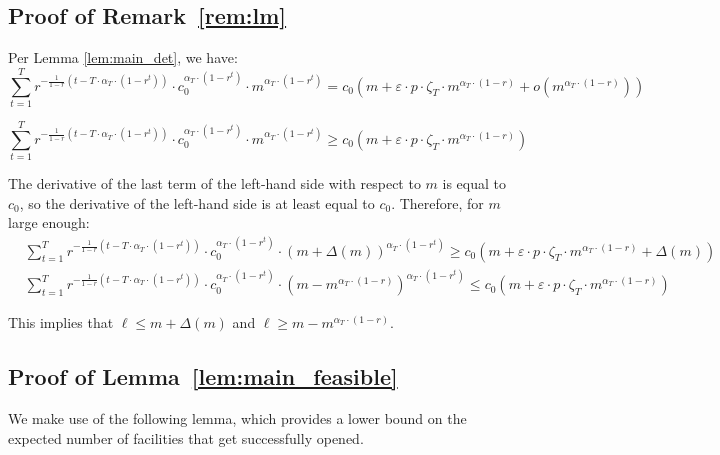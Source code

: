 \documentclass[nonblindrev]{informs3noheader}
\begin{document}

\subsection{Proof of Remark~\ref{rem:lm}}

Per Lemma \ref{lem:main_det}, we have:
\[\sum_{t=1}^T r^{-\frac{1}{1-r}\left(t-T\cdot\alpha_T\cdot(1-r^t)\right)}\cdot c_0^{\alpha_T\cdot(1-r^t)}\cdot m^{\alpha_T\cdot(1-r^t)}= c_0\left(m+\varepsilon\cdot p\cdot\zeta_T\cdot m^{\alpha_T\cdot(1-r)} + o\left(m^{\alpha_T \cdot (1-r)}\right)\right) \]

\[\sum_{t=1}^T r^{-\frac{1}{1-r}\left(t-T\cdot\alpha_T\cdot(1-r^t)\right)}\cdot c_0^{\alpha_T\cdot(1-r^t)}\cdot m^{\alpha_T\cdot(1-r^t)}\geq c_0\left(m+\varepsilon\cdot p\cdot\zeta_T\cdot m^{\alpha_T\cdot(1-r)}\right) \]

The derivative of the last term of the left-hand side with respect to $m$ is equal to $c_0$, so the derivative of the left-hand side is at least equal to $c_0$. Therefore, for $m$ large enough:
\begin{align*}
    & \sum_{t=1}^T r^{-\frac{1}{1-r}\left(t-T\cdot\alpha_T\cdot(1-r^t)\right)}\cdot c_0^{\alpha_T\cdot(1-r^t)}\cdot (m+\Delta(m))^{\alpha_T\cdot(1-r^t)}\geq c_0\left(m+\varepsilon\cdot p\cdot\zeta_T\cdot m^{\alpha_T\cdot(1-r)} + \Delta(m)\right)\\
    & \sum_{t=1}^T r^{-\frac{1}{1-r}\left(t-T\cdot\alpha_T\cdot(1-r^t)\right)}\cdot c_0^{\alpha_T\cdot(1-r^t)}\cdot \left(m-m^{\alpha_T\cdot(1-r)}\right)^{\alpha_T\cdot(1-r^t)}\leq c_0\left(m+\varepsilon\cdot p\cdot\zeta_T\cdot m^{\alpha_T\cdot(1-r)} \right)
\end{align*}

This implies that $\ell \leq m + \Delta(m)$ and $\ell\geq m-m^{\alpha_T\cdot(1-r)}$.
\hfill\Halmos

\subsection{Proof of Lemma~\ref{lem:main_feasible}}

We make use of the following lemma, which provides a lower bound on the expected number of facilities that get successfully opened.
\end{document}
